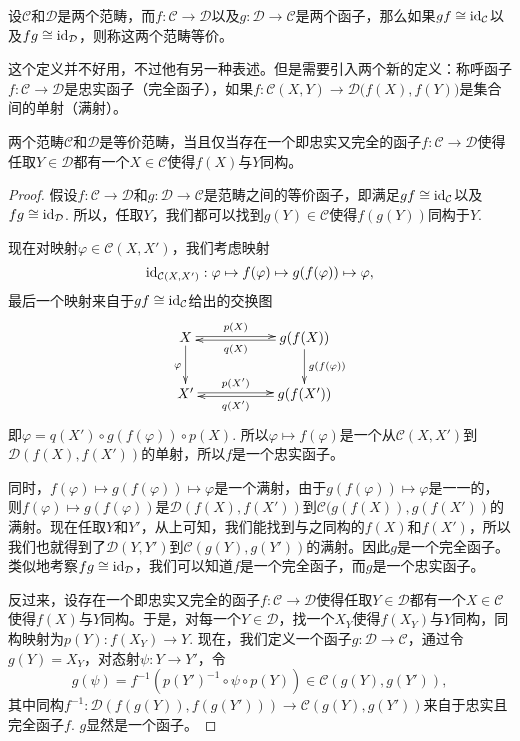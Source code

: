 设$\mathcal{C}$和$\mathcal{D}$是两个范畴，而$f:\mathcal{C}\to \mathcal{D}$以及$g:\mathcal{D}\to \mathcal{C}$是两个函子，那么如果$gf\cong \operatorname{id}_\mathcal{C}$以及$fg\cong \operatorname{id}_\mathcal{D}$，则称这两个范畴等价。

这个定义并不好用，不过他有另一种表述。但是需要引入两个新的定义：称呼函子$f:\mathcal{C}\to \mathcal{D}$是忠实函子（完全函子），如果$f:\mathcal{C}(X,Y)\to \mathcal{D}\bigl(f(X),f(Y)\bigr)$是集合间的单射（满射）。

\begin{pro}\label{equivcat}
两个范畴$\mathcal{C}$和$\mathcal{D}$是等价范畴，当且仅当存在一个即忠实又完全的函子$f:\mathcal{C}\to \mathcal{D}$使得任取$Y\in\mathcal{D}$都有一个$X\in \mathcal{C}$使得$f(X)$与$Y$同构。
\end{pro}

\begin{proof}
假设$f:\mathcal{C}\to \mathcal{D}$和$g:\mathcal{D}\to \mathcal{C}$是范畴之间的等价函子，即满足$gf\cong \operatorname{id}_\mathcal{C}$以及$fg\cong \operatorname{id}_\mathcal{D}$. 所以，任取$Y$，我们都可以找到$g(Y)\in\mathcal{C}$使得$f(g(Y))$同构于$Y$.

现在对映射$\varphi\in \mathcal{C}(X,X')$，我们考虑映射
\[
	\operatorname{id}_{\mathcal{C}(X,X')}:\varphi\mapsto f(\varphi) \mapsto g(f(\varphi)) \mapsto \varphi,
\]
最后一个映射来自于$gf\cong \operatorname{id}_\mathcal{C}$给出的交换图
\[
\begin{xy}
	\xymatrix{
		X\ar@<0.3ex>[rr]^-{p(X)} \ar[d]_{\varphi}&&g(f(X)) \ar[d]^{g(f(\varphi))}\ar@<0.3ex>[ll]^-{q(X)}\\
		X'\ar@<0.3ex>[rr]^-{p(X')}&&g(f(X'))\ar@<0.3ex>[ll]^-{q(X')}
	}
\end{xy}
\]
即$\varphi=q(X') \circ g(f(\varphi))\circ p(X)$. 所以$\varphi\mapsto f(\varphi)$是一个从$\mathcal{C}(X,X')$到$\mathcal{D}(f(X),f(X'))$的单射，所以$f$是一个忠实函子。

同时，$f(\varphi) \mapsto g(f(\varphi)) \mapsto \varphi$是一个满射，由于$g(f(\varphi)) \mapsto \varphi$是一一的，则$f(\varphi) \mapsto g(f(\varphi))$是$\mathcal{D}(f(X),f(X'))$到$\mathcal{C}(g(f(X)),g(f(X'))$的满射。现在任取$Y$和$Y'$，从上可知，我们能找到与之同构的$f(X)$和$f(X')$，所以我们也就得到了$\mathcal{D}(Y,Y')$到$\mathcal{C}(g(Y),g(Y'))$的满射。因此$g$是一个完全函子。类似地考察$fg\cong \operatorname{id}_\mathcal{D}$，我们可以知道$f$是一个完全函子，而$g$是一个忠实函子。

反过来，设存在一个即忠实又完全的函子$f:\mathcal{C}\to \mathcal{D}$使得任取$Y\in\mathcal{D}$都有一个$X\in \mathcal{C}$使得$f(X)$与$Y$同构。于是，对每一个$Y\in \mathcal{D}$，找一个$X_Y$使得$f(X_Y)$与$Y$同构，同构映射为$p(Y):f(X_Y)\to Y$. 现在，我们定义一个函子$g:\mathcal{D}\to \mathcal{C}$，通过令$g(Y)=X_Y$，对态射$\psi:Y\to Y'$，令
\[
	g(\psi)=f^{-1}\left(p(Y')^{-1}\circ \psi \circ p(Y)\right)\in \mathcal{C}(g(Y),g(Y')),
\]
其中同构$f^{-1}:\mathcal{D}(f(g(Y)),f(g(Y')))\to \mathcal{C}(g(Y),g(Y'))$来自于忠实且完全函子$f$. $g$显然是一个函子。


\end{proof}
